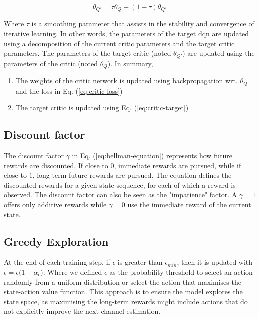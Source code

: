\begin{equation}\label{eq:critic-target}
    \theta_{Q'} = \tau \theta_Q + (1-\tau ) \theta_{Q'}
\end{equation}

\noindent Where $\tau$ is a smoothing parameter that assists in the stability and convergence of iterative learning. In other words, the parameters of the target \gls{dqn} are updated using a decomposition of the current critic parameters and the target critic parameters. The parameters of the target critic (noted $\theta_{Q'}$) are updated using the parameters of the critic (noted $\theta_Q$). In summary, 

\begin{enumerate}
    \item The weights of the critic network is updated using backpropagation wrt. $\theta_Q$ and the loss in Eq. (\ref{eq:critic-loss})
    \item The target critic is updated using Eq. (\ref{eq:critic-target})
\end{enumerate}

\subsection{Discount factor}
The discount factor $\gamma$ in Eq. (\ref{eq:bellman-equation}) represents how future rewards are discounted. If close to $0$, immediate rewards are pursued, while if close to $1$, long-term future rewards are pursued. The equation defines the discounted rewards for a given state sequence, for each of which a reward is observed. The discount factor can also be seen as the "impatience" factor. A $\gamma = 1$ offers only additive rewards while $\gamma = 0$ use the immediate reward of the current state. 

\subsection{Greedy Exploration}
At the end of each training step, if $\epsilon$ is greater than $\epsilon_{min}$, then it is updated with $\epsilon = \epsilon (1-\alpha_{\epsilon}$). Where we defined $\epsilon$ as the probability threshold to select an action randomly from a uniform distribution or select the action that maximises the state-action value function. This approach is to ensure the model explores the state space, as maximising the long-term rewards might include actions that do not explicitly improve the next channel estimation.




